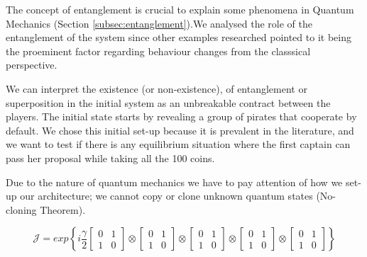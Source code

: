 The concept of entanglement is crucial to explain some phenomena in Quantum Mechanics (Section \ref{subsec:entanglement}).We analysed the role of the entanglement of the system since other examples researched pointed to it being the proeminent factor regarding behaviour changes from the classsical perspective\cite{Fra2011a}\cite{Fra2011}\cite{Letters2002}\cite{Khan2011}\cite{Ricketts2006}. 

We can interpret the existence (or non-existence), of entanglement or superposition in the initial system as an unbreakable contract between the players\cite{Piotrowski}. The initial state starts by revealing a group of pirates that cooperate by default. We chose this initial set-up because it is prevalent in the literature\cite{Eisert2008}\cite{Fra2011a}\cite{Fra2011}\cite{Letters2002}, and we want to test if there is any equilibrium situation where the first captain can pass her proposal while taking all the 100 coins. 



Due to the nature of quantum mechanics we have to pay attention of how we set-up our architecture; we cannot copy or clone unknown quantum states (No-cloning Theorem)\cite{Rieffel2011}. 



\begin{equation}
\mathcal{J}=exp\left\{ i\frac{\gamma}{2}\left[\begin{array}{cc}
0 & 1\\
1 & 0
\end{array}\right]\otimes\left[\begin{array}{cc}
0 & 1\\
1 & 0
\end{array}\right]\otimes\left[\begin{array}{cc}
0 & 1\\
1 & 0
\end{array}\right]\otimes\left[\begin{array}{cc}
0 & 1\\
1 & 0
\end{array}\right]
\otimes\left[\begin{array}{cc}
0 & 1\\
1 & 0
\end{array}\right]
\right\}
\label{eq:matrix_exponencial_esoterica}
\end{equation} 

